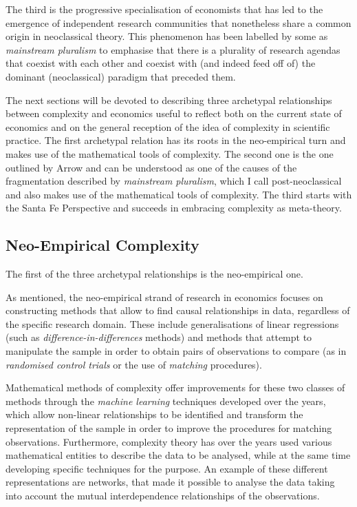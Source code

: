 \documentclass[a4paper, headings=standardclasses]{scrartcl}
\begin{document}
The third is the progressive specialisation of economists that has led to the emergence of independent research communities that nonetheless share a common origin in neoclassical theory. This phenomenon has been labelled by some as \textit{mainstream pluralism} \parencite{cedrini2018, davis2006, davis2019a} to emphasise that there is a plurality of research agendas that coexist with each other and coexist with (and indeed feed off of) the dominant (neoclassical) paradigm that preceded them.

The next sections will be devoted to describing three archetypal relationships between complexity and economics useful to reflect both on the current state of economics and on the general reception of the idea of complexity in scientific practice.
The first archetypal relation has its roots in the neo-empirical turn and makes use of the mathematical tools of complexity. The second one is the one outlined by Arrow and can be understood as one of the causes of the fragmentation described by \textit{mainstream pluralism}, which I call post-neoclassical and also makes use of the mathematical tools of complexity.
The third starts with the Santa Fe Perspective and succeeds in embracing complexity as meta-theory.

\subsection{Neo-Empirical Complexity}
The first of the three archetypal relationships is the neo-empirical one.

As mentioned, the neo-empirical strand of research in economics focuses on constructing methods that allow to find causal relationships in data, regardless of the specific research domain. These include generalisations of linear regressions (such as \textit{difference-in-differences} methods) and methods that attempt to manipulate the sample in order to obtain pairs of observations to compare (as in \textit{randomised control trials} or the use of \textit{matching} procedures).

Mathematical methods of complexity offer improvements for these two classes of methods through the \textit{machine learning} techniques developed over the years, which allow non-linear relationships to be identified and transform the representation of the sample in order to improve the procedures for matching observations.
Furthermore, complexity theory has over the years used various mathematical entities to describe the data to be analysed, while at the same time developing specific techniques for the purpose.
An example of these different representations are networks, that made it possible to analyse the data taking into account the mutual interdependence relationships of the observations. 
\end{document}
